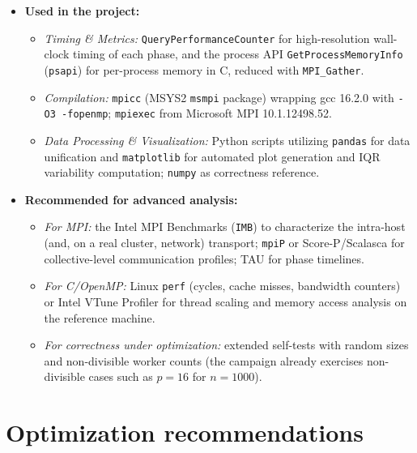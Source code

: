 \documentclass[12pt,a4paper]{article}
\begin{document}
\begin{itemize}
\item \textbf{Used in the project:}
\begin{itemize}
\item \textit{Timing \& Metrics:} \texttt{QueryPerformanceCounter} for
high-resolution wall-clock timing of each phase, and the process API
\texttt{GetProcessMemoryInfo} (\texttt{psapi}) for per-process memory in C,
reduced with \texttt{MPI\_Gather}.
\item \textit{Compilation:} \texttt{mpicc} (MSYS2 \texttt{msmpi} package)
wrapping gcc 16.2.0 with \texttt{-O3 -fopenmp}; \texttt{mpiexec} from
Microsoft MPI 10.1.12498.52.
\item \textit{Data Processing \& Visualization:} Python scripts utilizing
\texttt{pandas} for data unification and \texttt{matplotlib} for automated
plot generation and IQR variability computation; \texttt{numpy} as
correctness reference.
\end{itemize}
\item \textbf{Recommended for advanced analysis:}
\begin{itemize}
\item \textit{For MPI:} the Intel MPI Benchmarks (\texttt{IMB}) to
characterize the intra-host (and, on a real cluster, network) transport;
\texttt{mpiP} or Score-P/Scalasca for collective-level communication
profiles; TAU for phase timelines.
\item \textit{For C/OpenMP:} Linux \texttt{perf} (cycles, cache misses,
bandwidth counters) or Intel VTune Profiler for thread scaling and memory
access analysis on the reference machine.
\item \textit{For correctness under optimization:} extended self-tests with
random sizes and non-divisible worker counts (the campaign already
exercises non-divisible cases such as $p = 16$ for $n = 1000$).
\end{itemize}
\end{itemize}

\section{Optimization recommendations}
\label{sec:opt}
\end{document}
